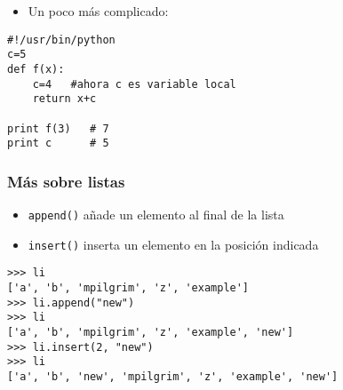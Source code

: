 \begin{frame}[fragile]
\begin{itemize}
  
\item  Un poco más complicado:

\end{itemize}


  \begin{footnotesize}
\begin{verbatim}
#!/usr/bin/python
c=5
def f(x):
    c=4   #ahora c es variable local
    return x+c
    
print f(3)   # 7
print c      # 5

\end{verbatim}
  \end{footnotesize}

\end{frame}






\begin{frame}[fragile]
\frametitle{Más sobre listas}

\begin{itemize}
\item \verb|append()| añade un elemento al final de la lista
\item \verb|insert()| inserta un elemento en la posición indicada
\end{itemize}  

\begin{footnotesize}
\begin{verbatim}
>>> li
['a', 'b', 'mpilgrim', 'z', 'example']
>>> li.append("new")               
>>> li
['a', 'b', 'mpilgrim', 'z', 'example', 'new']
>>> li.insert(2, "new")           
>>> li
['a', 'b', 'new', 'mpilgrim', 'z', 'example', 'new']
\end{verbatim}
\end{footnotesize}


\end{frame}



